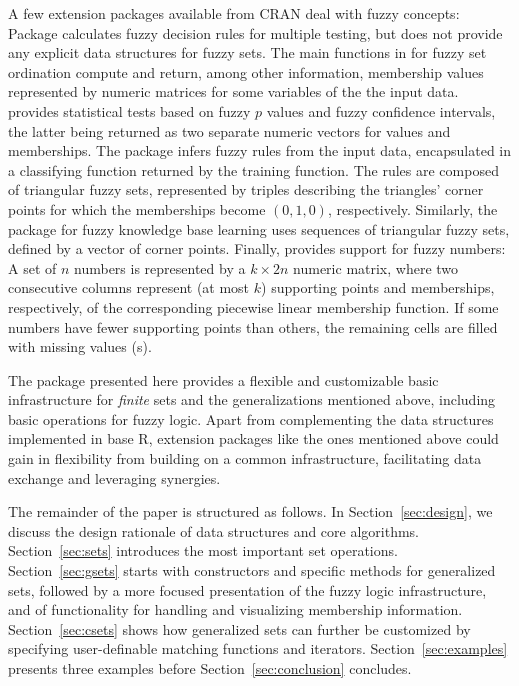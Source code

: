 \documentclass[article]{jss}
\newcommand\R{\textsf{R}}
\begin{document}
A few extension packages available from CRAN deal
with fuzzy concepts: Package 
\citep{sets:lewin:2007}
calculates fuzzy decision rules for multiple testing, but does not
provide any explicit data structures for fuzzy sets.
The main functions in 
\citep{sets:roberts:2007} for fuzzy set ordination compute and
return, among other information, membership values represented by
numeric matrices for some variables of the the input data.
 \citep{sets:geyer:2007} provides statistical tests
based on
fuzzy $p$ values and fuzzy confidence intervals, the latter being
returned as two separate numeric vectors for values and memberships. The
 package \citep{sets:vinterbo:2007}
infers fuzzy rules from the input data,
encapsulated in a classifying function returned by the training
function. The rules are composed of triangular fuzzy sets, represented
by triples describing the triangles' corner points for which the
memberships become $(0,1,0)$, respectively. Similarly, the 
package for fuzzy knowledge base learning \citep{sets:alvarez:2007}
uses sequences of triangular fuzzy sets, defined by a vector of corner
points. Finally,  \citep{sets:semagul+emine+rabiye:2008}
provides support for fuzzy
numbers: A set of $n$ numbers is represented by a $k \times 2n$
numeric matrix, where two consecutive columns represent (at most $k$)
supporting points and memberships,
respectively, of the corresponding piecewise linear
membership function. If some numbers have fewer supporting points than
others, the remaining cells are filled with missing values (s).

The  package
\citep{sets:meyer+hornik:2008} presented here
provides a flexible and customizable basic infrastructure for
\emph{finite} sets and the generalizations mentioned above, including
basic operations for fuzzy logic. Apart from complementing the data
structures implemented in
base \R, extension packages like the ones mentioned above
could gain in flexibility from building on a common infrastructure,
facilitating data exchange and leveraging synergies.

The remainder of the paper is
structured as follows. In Section~\ref{sec:design}, we discuss the
design rationale of data structures and core algorithms.
Section~\ref{sec:sets} introduces the most important set
operations. Section~\ref{sec:gsets} starts with constructors and
specific methods for generalized sets, followed by a more focused
presentation of the fuzzy logic infrastructure, and of functionality for
handling and visualizing membership information. Section~\ref{sec:csets}
shows how generalized sets can further be customized by specifying
user-definable matching functions and
iterators.  Section~\ref{sec:examples} presents three examples before
Section~\ref{sec:conclusion} concludes.
\end{document}
